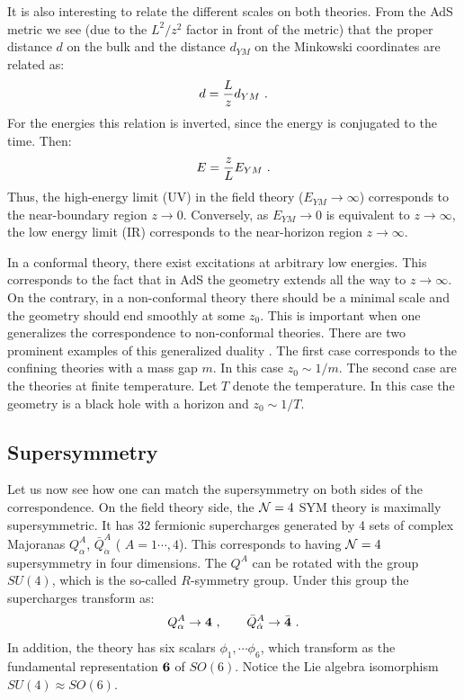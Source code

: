 \documentclass[12pt,notitlepage,a4paper]{article}
\newcommand{\beq}{\begin{equation}}
\newcommand{\eeq}{\end{equation}}
\begin{document}
 
 It is also interesting to relate  the different scales on both theories. From the AdS metric we see (due to the $L^2/ z^2$ factor in front of the metric) that the proper distance $d$ on the bulk and the distance $d_{YM}$ on the Minkowski coordinates are related as:
\beq
d={L\over z} d_{YM}\,\,.
\eeq
For the energies this relation is inverted, since the energy is conjugated to the time. Then:
\beq
E={z\over L} E_{YM}\,\,.
\eeq
Thus, the high-energy limit (UV) in the field theory ($E_{YM}\to \infty$) corresponds to the near-boundary region $z\to 0$. Conversely, as $E_{YM}\to 0$ is equivalent to $z\to\infty$, the low energy limit (IR) corresponds to the near-horizon region $z\to\infty$. 
 
In a conformal theory, there exist excitations at arbitrary low energies. This corresponds to the fact that in AdS the geometry extends all the way to $z\to \infty$. On the contrary, in a non-conformal theory there should be a minimal scale and the geometry should end smoothly at some $z_0$. This is important when one generalizes the correspondence to non-conformal theories. There are two prominent examples of this generalized duality . The first case corresponds to the  confining theories with a mass gap $m$. In this case $z_0\sim 1/ m$. The second case are the theories at  finite temperature. Let $T$ denote the temperature. In this case the geometry is a black hole with a horizon and $z_0\sim 1/ T$. 
 



 \subsection{ Supersymmetry}

Let us now see how one can match the supersymmetry on both sides of the correspondence. On the field theory side,  the  ${\cal N}=4$ SYM theory  is maximally supersymmetric. It has 32 fermionic supercharges generated by 4 sets of complex Majoranas $Q_{\alpha}^{A}$, $\bar Q_{\dot\alpha}^{A}$ ( $A=1\cdots, 4$). This corresponds to having ${\cal N}=4$ supersymmetry  in four dimensions. The $Q^{A}$ can be rotated with the group $SU(4)$,  which is the so-called $R$-symmetry group. Under this group the supercharges transform as:
\beq
Q_{\alpha}^{A}\to {\bf 4}\,\,,
\qquad
\bar Q_{\dot\alpha}^{A}\to \bar{\bf 4}\,\,.
\eeq
In addition, the theory has six scalars $\phi_1,\cdots \phi_6$, which transform as the fundamental representation ${\bf 6}$ of $SO(6)$. Notice the Lie algebra isomorphism $SU(4)\approx SO(6)$. 
 
\end{document}
